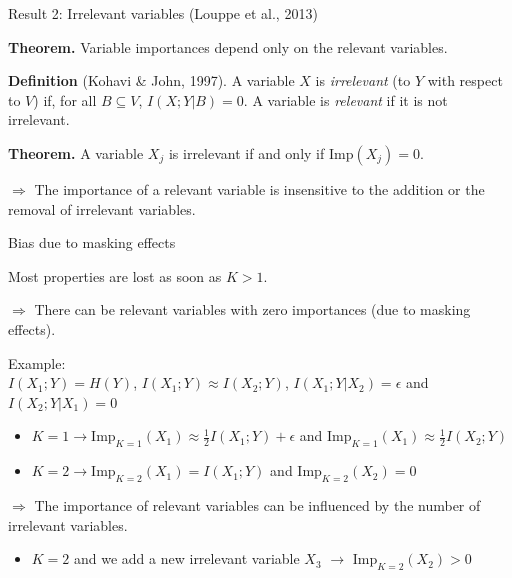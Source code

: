 \documentclass{beamer}
\begin{document}
\begin{frame}{Result 2: Irrelevant variables {\scriptsize (Louppe et al., 2013)}}

{\bf Theorem.} Variable importances depend only on the relevant variables.

\vspace{1cm}

\textbf{Definition} {\scriptsize (Kohavi \& John, 1997)}. A variable $X$ is
{\it irrelevant} (to $Y$ with respect to $V$) if, for all $B\subseteq V$,
$I(X;Y|B)=0$. A variable is {\it relevant} if it is not irrelevant.

\vspace{1cm}

{\bf Theorem.} A variable $X_j$ is irrelevant if and only if $\text{Imp}(X_j)= 0$.

\vspace{1cm}

{\color{blue} $\Rightarrow$ The importance of a relevant variable is
insensitive  to the addition or the removal of irrelevant variables.}

\end{frame}

\begin{frame}{Bias due to masking effects}

Most properties are lost as soon as $K>1$.

\bigskip

{\color{red}$\Rightarrow$ There can be relevant variables with zero
importances (due to masking effects).}

\medskip

{\footnotesize
Example:\\
$I(X_1;Y)=H(Y)$, $I(X_1;Y) \approx I(X_2;Y)$, $I(X_1;Y|X_2)=\epsilon$ and $I(X_2;Y|X_1)=0$
\begin{itemize}
\item $K=1 \rightarrow \text{Imp}_{K=1}(X_1) \approx \frac{1}{2} I(X_1;Y)+\epsilon$ and $\text{Imp}_{K=1}(X_1)\approx \frac{1}{2} I(X_2;Y)$
\item $K=2 \rightarrow \text{Imp}_{K=2}(X_1)=I(X_1;Y)$ and $\text{Imp}_{K=2}(X_2)=0$
\end{itemize}}

\bigskip

{\color{red}$\Rightarrow$ The importance of relevant variables can be
influenced by the number of irrelevant variables.}

\medskip

{\footnotesize
\begin{itemize}
\item $K=2$ and we add a new irrelevant variable $X_3$ $\rightarrow$ $\text{Imp}_{K=2}(X_2)>0$
\end{itemize}}

\end{frame}
\end{document}
